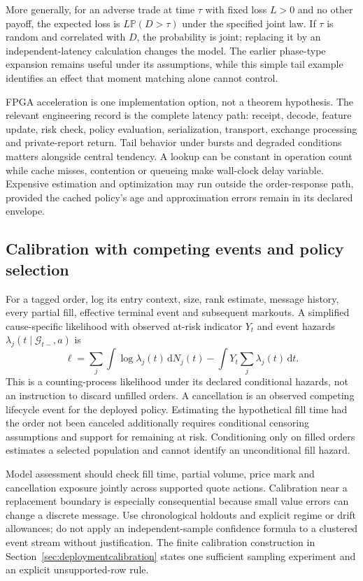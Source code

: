 More generally, for an adverse trade at time $\tau$ with fixed loss $L>0$
and no other payoff, the expected loss is
$L\mathbb P(D>\tau)$ under the specified joint law. If $\tau$ is random
and correlated with $D$, the probability is joint; replacing it by an
independent-latency calculation changes the model. The earlier phase-type
expansion remains useful under its assumptions, while this simple tail
example identifies an effect that moment matching alone cannot control.

FPGA acceleration is one implementation option, not a theorem hypothesis.
The relevant engineering record is the complete latency path: receipt,
decode, feature update, risk check, policy evaluation, serialization,
transport, exchange processing and private-report return. Tail behavior
under bursts and degraded conditions matters alongside central tendency.
A lookup can be constant in operation count while cache misses, contention
or queueing make wall-clock delay variable. Expensive estimation and
optimization may run outside the order-response path, provided the cached
policy's age and approximation errors remain in its declared envelope.

\subsection{Calibration with competing events and policy selection}

For a tagged order, log its entry context, size, rank estimate, message
history, every partial fill, effective terminal event and subsequent markouts.
A simplified cause-specific likelihood with observed at-risk indicator $Y_t$
and event hazards $\lambda_j(t\mid\mathcal G_{t-},a)$ is
\[
 \ell=\sum_j\int\log\lambda_j(t)\,\mathrm dN_j(t)
       -\int Y_t\sum_j\lambda_j(t)\,\mathrm dt.
\]
This is a counting-process likelihood under its declared conditional hazards,
not an instruction to discard unfilled orders. A cancellation is an observed
competing lifecycle event for the deployed policy. Estimating the hypothetical
fill time had the order not been canceled additionally requires conditional
censoring assumptions and support for remaining at risk. Conditioning only
on filled orders estimates a selected population and cannot identify an
unconditional fill hazard.

Model assessment should check fill time, partial volume, price mark and
cancellation exposure jointly across supported quote actions. Calibration
near a replacement boundary is especially consequential because small value
errors can change a discrete message. Use chronological holdouts and explicit
regime or drift allowances; do not apply an independent-sample confidence
formula to a clustered event stream without justification. The finite
calibration construction in Section~\ref{sec:deploymentcalibration} states
one sufficient sampling experiment and an explicit unsupported-row rule.

